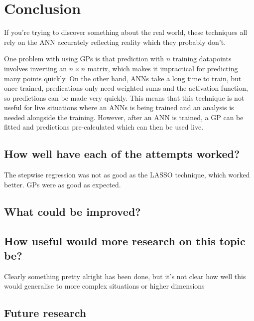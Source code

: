 
\chapter{Conclusion}

If you're trying to discover something about the real world, these techniques all rely on the \ac{ANN} accurately reflecting reality which they probably don't.

One problem with using \acp{GP} is that prediction with \(n\) training datapoints involves inverting an \(n \times n\) matrix, which makes it impractical for predicting many points quickly.
On the other hand, \acp{ANN} take a long time to train, but once trained, predications only need weighted sums and the activation function, so predictions can be made very quickly.
This means that this technique is not useful for live situations where an \acp{ANN} is being trained and an analysis is needed alongside the training.
However, after an \ac{ANN} is trained, a \ac{GP} can be fitted and predictions pre-calculated which can then be used live.

\section{How well have each of the attempts worked?}

The stepwise regression was not as good as the \ac{LASSO} technique, which worked better.
\acp{GP} were as good as expected.

\section{What could be improved?}

\section{How useful would more research on this topic be?}

\begin{todo}
	Clearly something pretty alright has been done, but it's not clear how well this would generalise to more complex situations or higher dimensions
\end{todo}

\section{Future research}

